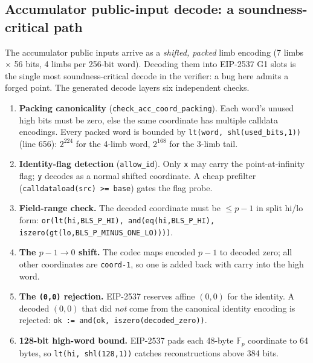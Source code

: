 \subsection{Accumulator public-input decode: a soundness-critical path}
\label{sec:pr-acc-decode}

The accumulator public inputs arrive as a \emph{shifted, packed} limb
encoding (7 limbs $\times$ 56 bits, 4 limbs per 256-bit word).
Decoding them into EIP-2537 G1 slots is the single most
soundness-critical decode in the verifier: a bug here admits a forged
point. The generated decode layers six independent checks.

\begin{enumerate}[leftmargin=1.5em,itemsep=2pt]
  \item \textbf{Packing canonicality} (\texttt{check\_\allowbreak{}acc\_\allowbreak{}coord\_\allowbreak{}packing}).
        Each word's unused high bits must be zero, else the same
        coordinate has multiple calldata encodings. Every packed word is
        bounded by \texttt{lt(word, shl(used\_\allowbreak{}bits,1))} (line 656):
        $2^{224}$ for the 4-limb word, $2^{168}$ for the 3-limb tail.
  \item \textbf{Identity-flag detection} (\texttt{allow\_id}). Only
        \texttt{x} may carry the point-at-infinity flag; \texttt{y}
        decodes as a normal shifted coordinate. A cheap prefilter
        (\texttt{calldataload(src) >= base}) gates the flag probe.
  \item \textbf{Field-range check.} The decoded coordinate must be
        $\le p-1$ in split hi/lo form:
        \texttt{or(lt(hi,BLS\_\allowbreak{}P\_\allowbreak{}HI), and(eq(hi,BLS\_\allowbreak{}P\_\allowbreak{}HI), iszero(gt(lo,BLS\_\allowbreak{}P\_\allowbreak{}MINUS\_\allowbreak{}ONE\_\allowbreak{}LO))))}.
  \item \textbf{The \texorpdfstring{$p{-}1 \to 0$}{p-1 -> 0} shift.}
        The codec maps encoded $p{-}1$ to decoded zero; all other
        coordinates are \texttt{coord-1}, so one is added back with
        carry into the high word.
  \item \textbf{The \texttt{(0,0)} rejection.} EIP-2537 reserves
        affine $(0,0)$ for the identity. A decoded $(0,0)$ that did
        \emph{not} come from the canonical identity encoding is
        rejected: \texttt{ok := and(ok, iszero(decoded\_\allowbreak{}zero))}.
  \item \textbf{128-bit high-word bound.} EIP-2537 pads each 48-byte
        $\mathbb{F}_p$ coordinate to 64 bytes, so
        \texttt{lt(hi, shl(128,1))} catches reconstructions above
        384 bits.
\end{enumerate}

